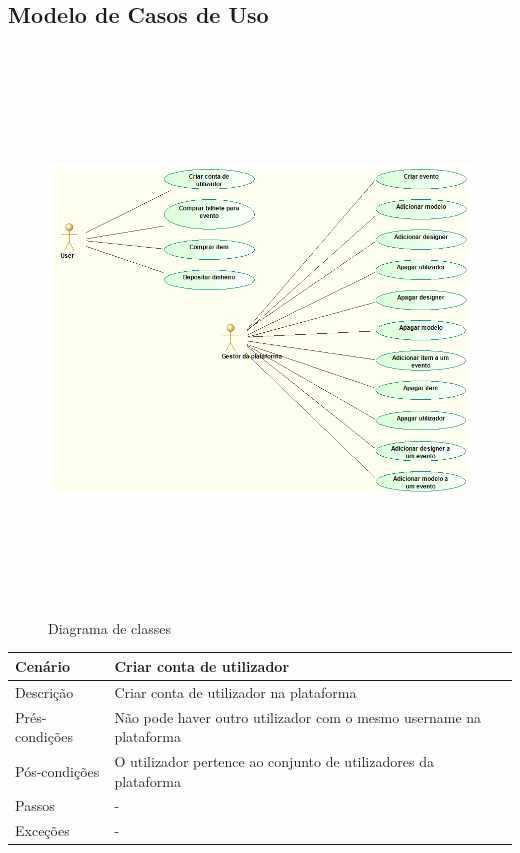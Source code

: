 \documentclass{article}
\begin{document}
\subsection{Modelo de Casos de Uso}
\begin{figure}[H]
\centering
\includegraphics[width=160mm,height=150mm]{./images/usecasediagram.png}
\caption{Diagrama de classes}
\label{fig:method}
\end{figure}

\begin{center}
\begin{tabular}{ |p{2.5cm}|p{9cm}| }
\hline
 Cenário & Criar conta de utilizador \\
\hline
Descrição & Criar conta de utilizador na plataforma\\
\hline
 Prés-condições & Não pode haver outro utilizador com o mesmo username na plataforma \\
\hline
Pós-condições & O utilizador pertence ao conjunto de utilizadores da plataforma\\
\hline
Passos & -\\
\hline
Exceções &  -\\
\hline
\end{tabular}
\end{center}
\end{document}
